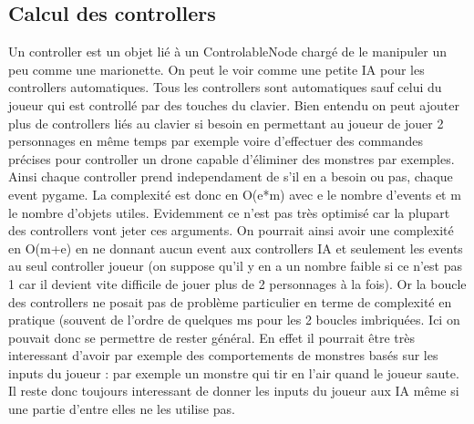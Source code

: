\documentclass[11pt]{article}
\begin{document}
\subsection{Calcul des controllers}
Un controller est un objet lié à un ControlableNode chargé de le manipuler un peu comme une marionette. On peut le voir comme une petite IA pour les controllers automatiques. Tous les controllers sont automatiques sauf celui du joueur qui est controllé par des touches du clavier. Bien entendu on peut ajouter plus de controllers liés au clavier si besoin en permettant au joueur de jouer 2 personnages en même temps par exemple voire d'effectuer des commandes précises pour controller un drone capable d'éliminer des monstres par exemples. Ainsi chaque controller prend independament de s'il en a besoin ou pas, chaque event pygame. La complexité est donc en O(e*m) avec e le nombre d'events et m le nombre d'objets utiles. Evidemment ce n'est pas très optimisé car la plupart des controllers vont jeter ces arguments. On pourrait ainsi avoir une complexité en O(m+e) en ne donnant aucun event aux controllers IA et seulement les events au seul controller joueur (on suppose qu'il y en a un nombre faible si ce n'est pas 1 car il devient vite difficile de jouer plus de 2 personnages à la fois). Or la boucle des controllers ne posait pas de problème particulier en terme de complexité en pratique (souvent de l'ordre de quelques ms pour les 2 boucles imbriquées. Ici on pouvait donc se permettre de rester général. En effet il pourrait être très interessant d'avoir par exemple des comportements de monstres basés sur les inputs du joueur : par exemple un monstre qui tir en l'air quand le joueur saute. Il reste donc toujours interessant de donner les inputs du joueur aux IA même si une partie d'entre elles ne les utilise pas.
\end{document}
